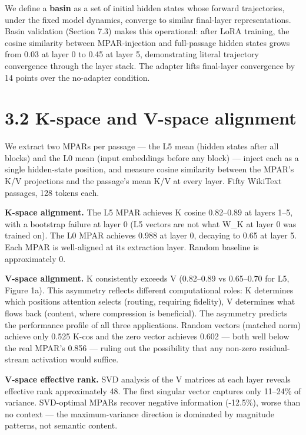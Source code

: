 We define a \textbf{basin} as a set of initial hidden states whose forward trajectories, under the fixed model dynamics, converge to similar final-layer representations. Basin validation (Section 7.3) makes this operational: after LoRA training, the cosine similarity between MPAR-injection and full-passage hidden states grows from 0.03 at layer 0 to 0.45 at layer 5, demonstrating literal trajectory convergence through the layer stack. The adapter lifts final-layer convergence by 14 points over the no-adapter condition.

\section{3.2 K-space and V-space alignment}\label{k-space-and-v-space-alignment}

We extract two MPARs per passage --- the L5 mean (hidden states after all blocks) and the L0 mean (input embeddings before any block) --- inject each as a single hidden-state position, and measure cosine similarity between the MPAR's K/V projections and the passage's mean K/V at every layer. Fifty WikiText passages, 128 tokens each.

\textbf{K-space alignment.} The L5 MPAR achieves K cosine 0.82--0.89 at layers 1--5, with a bootstrap failure at layer 0 (L5 vectors are not what W\_K at layer 0 was trained on). The L0 MPAR achieves 0.988 at layer 0, decaying to 0.65 at layer 5. Each MPAR is well-aligned at its extraction layer. Random baseline is approximately 0.

\textbf{V-space alignment.} K consistently exceeds V (0.82--0.89 vs 0.65--0.70 for L5, Figure 1a). This asymmetry reflects different computational roles: K determines which positions attention selects (routing, requiring fidelity), V determines what flows back (content, where compression is beneficial). The asymmetry predicts the performance profile of all three applications. Random vectors (matched norm) achieve only 0.525 K-cos and the zero vector achieves 0.602 --- both well below the real MPAR's 0.856 --- ruling out the possibility that any non-zero residual-stream activation would suffice.

\textbf{V-space effective rank.} SVD analysis of the V matrices at each layer reveals effective rank approximately 48. The first singular vector captures only 11--24\% of variance. SVD-optimal MPARs recover negative information (-12.5\%), worse than no context --- the maximum-variance direction is dominated by magnitude patterns, not semantic content.

